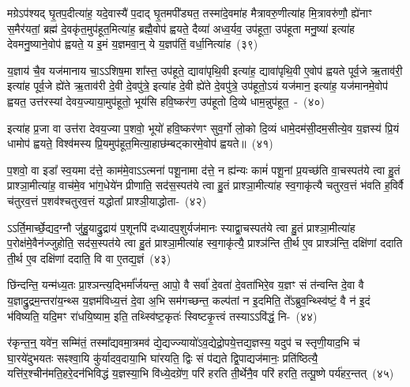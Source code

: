 मग्रे\-ऽप॑श्यद् घृ॒तप॒दीत्या॑ह॒ यदे॒वास्यै॑ प॒दाद् घृ॒तमपी᳚ड्यत॒ तस्मा॑दे॒वमा॑ह मैत्रावरु॒णीत्या॑ह मि॒त्रावरु॑णौ॒ ह्ये॑नाꣳ स॒मैर॑यतां॒ ब्रह्म॑ दे॒वकृ॑त॒मुप॑हूत॒मित्या॑ह॒ ब्रह्मै॒वोप॑ ह्वयते॒ दैव्या॑ अध्व॒र्यव॒ उप॑हूता॒ उप॑हूता मनु॒ष्या॑ इत्या॑ह देवमनु॒ष्याने॒वोप॑ ह्वयते॒ य इ॒मं य॒ज्ञमवा॒न्॒ ये य॒ज्ञप॑तिं॒ वर्धा॒नित्या॑ह~(३९)\ip

य॒ज्ञाय॑ चै॒व यज॑मानाय चा॒\-ऽऽ\-शिष॒मा शा᳚स्त॒ उप॑हूते॒ द्यावा॑\-पृथि॒वी इत्या॑ह॒ द्यावा॑\-पृथि॒वी ए॒वोप॑ ह्वयते पूर्व॒जे ऋ॒ताव॑री॒ इत्या॑ह पूर्व॒जे ह्ये॑ते ऋ॒ताव॑री दे॒वी दे॒वपु॑त्रे॒ इत्या॑ह दे॒वी ह्ये॑ते दे॒वपु॑त्रे॒ उप॑हूतो॒\-ऽयं यज॑मान॒ इत्या॑ह॒ यज॑मानमे॒वोप॑ ह्वयत॒ उत्त॑रस्यां देवय॒ज्याया॒मुप॑हूतो॒ भूय॑सि हवि॒ष्कर॑ण॒ उप॑हूतो दि॒व्ये धाम॒न्नुप॑हूत॒~-~(४०)\ip

इत्या॑ह प्र॒जा वा उत्त॑रा देवय॒ज्या प॒शवो॒ भूयो॑ हवि॒ष्कर॑णꣳ सुव॒र्गो लो॒को दि॒व्यं धामे॒दम॑सी॒दम॒सीत्ये॒व य॒ज्ञस्य॑ प्रि॒यं धामोप॑ ह्वयते॒ विश्व॑मस्य प्रि॒यमुप॑हूत॒मित्या॒हाछ॑म्बट्कारमे॒वोप॑ ह्वयते॥~(४१)\ip

{\anuvakamend[{आ॒ह॒ धे॒नुरे॒तां वर्धा॒नित्या॑ह॒ धाम॒न्नुप॑हूत॒श्चतु॑स्त्रिꣳशच्च}]}

प॒शवो॒ वा इडा᳚ स्व॒यमा द॑त्ते॒ काम॑मे॒वा\-ऽऽ\-त्मना॑ पशू॒नामा द॑त्ते॒ न ह्य॑न्यः कामं॑ पशू॒नां प्र॒यच्छ॑ति वा॒चस्पत॑ये त्वा हु॒तं प्राश्ञा॒मीत्या॑ह॒ वाच॑मे॒व भा॑ग॒धेये॑न प्रीणाति॒ सद॑स॒स्पत॑ये त्वा हु॒तं प्राश्ञा॒मीत्या॑ह स्व॒गाकृ॑त्यै चतुरव॒त्तं भ॑वति ह॒विर्वै च॑तुरव॒त्तं प॒शव॑श्चतुरव॒त्तं यद्धोता᳚ प्राश्ञी॒याद्धोता-~(४२)\ip

ऽऽर्ति॒मार्च्छे॒द्यद॒ग्नौ जु॑हु॒याद्रु॒द्राय॑ प॒शूनपि॑ दध्यादप॒शुर्यज॑मानः स्याद्वा॒चस्पत॑ये त्वा हु॒तं प्राश्ञा॒मीत्या॑ह प॒रोक्ष॑मे॒वैन॑ज्जुहोति॒ सद॑स॒स्पत॑ये त्वा हु॒तं प्राश्ञा॒मीत्या॑ह स्व॒गाकृ॑त्यै॒ प्राश्ञ॑न्ति ती॒र्थ ए॒व प्राश्ञ॑न्ति॒ दक्षि॑णां ददाति ती॒र्थ ए॒व दक्षि॑णां ददाति॒ वि वा ए॒तद्य॒ज्ञं~(४३)\ip

छि॑न्दन्ति॒ यन्म॑ध्य॒तः प्रा॒श्ञन्त्य॒द्भिर्मा᳚र्जयन्त॒ आपो॒ वै सर्वा॑ दे॒वता॑ दे॒वता॑भिरे॒व य॒ज्ञꣳ सं त॑न्वन्ति दे॒वा वै य॒ज्ञाद्रु॒द्रम॒न्तरा॑य॒न्थ्स य॒ज्ञम॑विध्य॒त्तं दे॒वा अ॒भि सम॑गच्छन्त॒ कल्प॑तां न इ॒दमिति॒ ते᳚\-ऽब्रुव॒न्थ्स्वि॑ष्टं॒ वै न॑ इ॒दं भ॑विष्यति॒ यदि॒मꣳ रा॑धयि॒ष्याम॒ इति॒ तथ्स्वि॑ष्ट॒कृतः॑ स्विष्टकृ॒त्त्वं तस्या\-ऽऽ\-वि॑द्धं॒ नि-~(४४)\ip

र॑कृन्त॒न्॒ यवे॑न॒ सम्मि॑तं॒ तस्मा᳚द्\-यवमा॒त्रमव॑ द्ये॒द्यज्ज्यायो॑\-ऽव॒द्येद्रो॒पये॒त्तद्य॒ज्ञस्य॒ यदुप॑ च स्तृणी॒याद॒भि च॑ घा॒रये॑दुभयतः सꣴश्वा॒यि कु॑र्यादव॒दाया॒भि घा॑रयति॒ द्विः सं प॑द्यते द्वि॒पाद्यज॑मानः॒ प्रति॑ष्ठित्यै॒ यत्ति॑र॒श्चीन॑मति॒हरे॒दन॑भिविद्धं य॒ज्ञस्या॒भि वि॑ध्ये॒दग्रे॑ण॒ परि॑ हरति ती॒र्थेनै॒व परि॑ हरति॒ तत्पू॒ष्णे पर्य॑हर॒न्तत्~(४५)\ip


